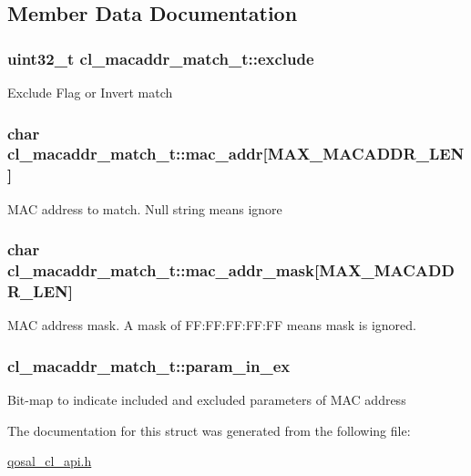 \subsection{Member Data Documentation}
\hypertarget{structcl__macaddr__match__t_abfcdb9a9949a2ba700c4eb5e2d334e30}{
\subsubsection[{exclude}]{\setlength{\rightskip}{0pt plus 5cm}uint32\-\_\-t cl\-\_\-macaddr\-\_\-match\-\_\-t\-::exclude}}\label{structcl__macaddr__match__t_abfcdb9a9949a2ba700c4eb5e2d334e30}
Exclude Flag or Invert match \hypertarget{structcl__macaddr__match__t_a9ba77bbd538c732284e04b1ea1dc0a47}{
\subsubsection[{mac\-\_\-addr}]{\setlength{\rightskip}{0pt plus 5cm}char cl\-\_\-macaddr\-\_\-match\-\_\-t\-::mac\-\_\-addr\mbox{[}{\bf M\-A\-X\-\_\-\-M\-A\-C\-A\-D\-D\-R\-\_\-\-L\-E\-N}\mbox{]}}}\label{structcl__macaddr__match__t_a9ba77bbd538c732284e04b1ea1dc0a47}
M\-A\-C address to match. Null string means ignore \hypertarget{structcl__macaddr__match__t_aa661f14e7e8588a53e6b25f5e64f24d6}{
\subsubsection[{mac\-\_\-addr\-\_\-mask}]{\setlength{\rightskip}{0pt plus 5cm}char cl\-\_\-macaddr\-\_\-match\-\_\-t\-::mac\-\_\-addr\-\_\-mask\mbox{[}{\bf M\-A\-X\-\_\-\-M\-A\-C\-A\-D\-D\-R\-\_\-\-L\-E\-N}\mbox{]}}}\label{structcl__macaddr__match__t_aa661f14e7e8588a53e6b25f5e64f24d6}
M\-A\-C address mask. A mask of F\-F\-:\-F\-F\-:\-F\-F\-:\-F\-F\-:F\-F means mask is ignored. \hypertarget{structcl__macaddr__match__t_a8defd30e648caeb188f39a722ae47cdd}{
\subsubsection[{param\-\_\-in\-\_\-ex}]{ cl\-\_\-macaddr\-\_\-match\-\_\-t\-::param\-\_\-in\-\_\-ex}}\label{structcl__macaddr__match__t_a8defd30e648caeb188f39a722ae47cdd}
Bit-\/map to indicate included and excluded parameters of M\-A\-C address 

The documentation for this struct was generated from the following file\-:\begin{DoxyCompactItemize}
\item 
\hyperlink{qosal__cl__api_8h}{qosal\-\_\-cl\-\_\-api.\-h}\end{DoxyCompactItemize}
